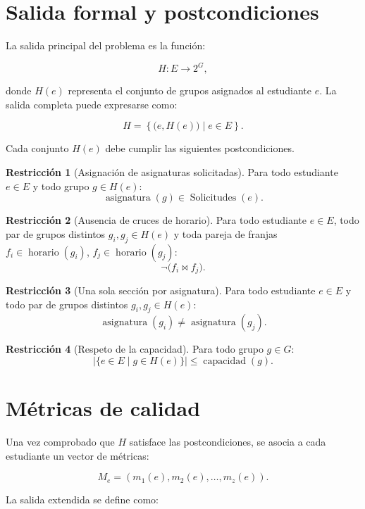 \documentclass[11pt]{article}
\numberwithin{equation}{section}
\numberwithin{figure}{section}
\numberwithin{table}{section}
\theoremstyle{definition}
\newtheorem*{restriccion}{Restricción}
\begin{document}
\section{Salida formal y postcondiciones}

La salida principal del problema es la función:

\[
H:E\rightarrow 2^G,
\]

donde $H(e)$ representa el conjunto de grupos asignados al estudiante $e$.
La salida completa puede expresarse como:

\[
H=\left\{\bigl(e,H(e)\bigr)\mid e\in E\right\}.
\]

Cada conjunto $H(e)$ debe cumplir las siguientes postcondiciones.

\begin{restriccion}[Asignación de asignaturas solicitadas]
Para todo estudiante $e\in E$ y todo grupo $g\in H(e)$:
\[
\operatorname{asignatura}(g)\in\operatorname{Solicitudes}(e).
\]
\end{restriccion}

\begin{restriccion}[Ausencia de cruces de horario]
Para todo estudiante $e\in E$, todo par de grupos distintos
$g_i,g_j\in H(e)$ y toda pareja de franjas
$f_i\in\operatorname{horario}(g_i)$,
$f_j\in\operatorname{horario}(g_j)$:
\[
\neg\bigl(f_i\bowtie f_j\bigr).
\]
\end{restriccion}

\begin{restriccion}[Una sola sección por asignatura]
Para todo estudiante $e\in E$ y todo par de grupos distintos
$g_i,g_j\in H(e)$:
\[
\operatorname{asignatura}(g_i)\neq\operatorname{asignatura}(g_j).
\]
\end{restriccion}

\begin{restriccion}[Respeto de la capacidad]
Para todo grupo $g\in G$:
\[
\left|\{e\in E\mid g\in H(e)\}\right|
\leq\operatorname{capacidad}(g).
\]
\end{restriccion}

\section{Métricas de calidad}

Una vez comprobado que $H$ satisface las postcondiciones, se asocia a cada
estudiante un vector de métricas:

\[
M_e=\left(m_1(e),m_2(e),\ldots,m_z(e)\right).
\]

La salida extendida se define como:
\end{document}
